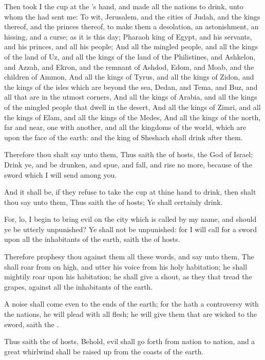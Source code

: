 \verse Then took I the cup at the \LORD's hand, and made all the nations to drink, unto whom the \LORD had sent me: \verse To wit, Jerusalem, and the cities of Judah, and the kings thereof, and the princes thereof, to make them a desolation, an astonishment, an hissing, and a curse; as it is this day; \verse Pharaoh king of Egypt, and his servants, and his princes, and all his people; \verse And all the mingled people, and all the kings of the land of Uz, and all the kings of the land of the Philistines, and Ashkelon, and Azzah, and Ekron, and the remnant of Ashdod, \verse Edom, and Moab, and the children of Ammon, \verse And all the kings of Tyrus, and all the kings of Zidon, and the kings of the isles which are beyond the sea, \verse Dedan, and Tema, and Buz, and all that are in the utmost corners, \verse And all the kings of Arabia, and all the kings of the mingled people that dwell in the desert, \verse And all the kings of Zimri, and all the kings of Elam, and all the kings of the Medes, \verse And all the kings of the north, far and near, one with another, and all the kingdoms of the world, which are upon the face of the earth: and the king of Sheshach shall drink after them.

\verse Therefore thou shalt say unto them, Thus saith the \LORD of hosts, the God of Israel; Drink ye, and be drunken, and spue, and fall, and rise no more, because of the sword which I will send among you.

\verse And it shall be, if they refuse to take the cup at thine hand to drink, then shalt thou say unto them, Thus saith the \LORD of hosts; Ye shall certainly drink.

\verse For, lo, I begin to bring evil on the city which is called by my name, and should ye be utterly unpunished? Ye shall not be unpunished: for I will call for a sword upon all the inhabitants of the earth, saith the \LORD of hosts.

\verse Therefore prophesy thou against them all these words, and say unto them, The \LORD shall roar from on high, and utter his voice from his holy habitation; he shall mightily roar upon his habitation; he shall give a shout, as they that tread the grapes, against all the inhabitants of the earth.

\verse A noise shall come even to the ends of the earth; for the \LORD hath a controversy with the nations, he will plead with all flesh; he will give them that are wicked to the sword, saith the \LORD.

\verse Thus saith the \LORD of hosts, Behold, evil shall go forth from nation to nation, and a great whirlwind shall be raised up from the coasts of the earth.

